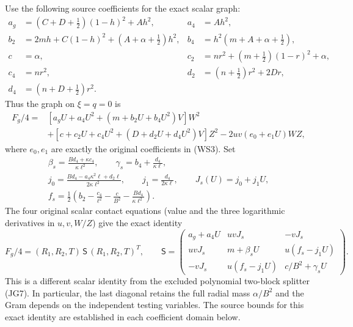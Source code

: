 Use the following source coefficients for the exact scalar graph:
\begin{align*}
 a_g&=(C+D+\tfrac12)(1-h)^2+Ah^2,&a_4&=Ah^2,\\
 b_2&=2mh+C(1-h)^2+(A+\alpha+\tfrac12)h^2,
 &b_4&=h^2(m+A+\alpha+\tfrac12),\\
 c&=\alpha,&c_2&=nr^2+(m+\tfrac12)(1-r)^2+\alpha,\\
 c_4&=nr^2,&d_2&=(n+\tfrac12)r^2+2Dr,\\
 d_4&=(n+D+\tfrac12)r^2.
\end{align*}
Thus the graph on $\xi=q=0$ is
\[
 \begin{split}
 F_g/4={}&[a_gU+a_4U^2+(m+b_2U+b_4U^2)V]W^2\\
 &+[c+c_2U+c_4U^2+(D+d_2U+d_4U^2)V]Z^2
       -2uv(e_0+e_1U)WZ,
 \end{split}
\]
where $e_0,e_1$ are exactly the original coefficients in (WS3).
Set
\[
 \begin{gathered}
 \beta_s=\frac{Bd_4+\kappa c_4}{\kappa\ell^2},\qquad
 \gamma_s=b_4+\frac{d_4}{\kappa\ell},\\
 j_0=\frac{Bd_4-a_4\kappa^2\ell+d_2\ell}
                   {2\kappa\ell^2},\qquad
 j_1=\frac{d_4}{2\kappa\ell},\qquad J_s(U)=j_0+j_1U,\\
 f_s=\frac12\left(b_2-\frac{c_4}{\ell^2}
                -\frac c{B^2}-\frac{Bd_4}{\kappa\ell^2}\right).
 \end{gathered}                                        \tag{WA4}
\]
The four original scalar contact equations (value and the three
logarithmic derivatives in $u,v,W/Z$) give the exact identity
\[
 F_g/4=(R_1,R_2,T)\,\mathsf S\,(R_1,R_2,T)^T,\qquad
 \mathsf S=
 \begin{pmatrix}
 a_g+a_4U&uvJ_s&-vJ_s\\
 uvJ_s&m+\beta_sU&u(f_s-j_1U)\\
 -vJ_s&u(f_s-j_1U)&c/B^2+\gamma_sU
 \end{pmatrix}.                                       \tag{WA5}
\]
This is a different scalar identity from the excluded polynomial
two-block splitter (JG7). In particular, the last diagonal retains
the full radial mass $\alpha/B^2$ and the Gram depends on the
independent testing variables. The source bounds for this exact identity are established in each coefficient domain below.

